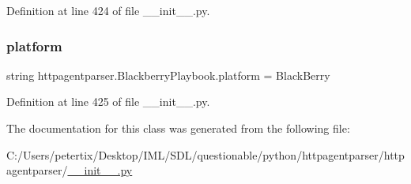 Definition at line 424 of file \+\_\+\+\_\+init\+\_\+\+\_\+.\+py.

\hypertarget{classhttpagentparser_1_1_blackberry_playbook_ab173bb0349f595500322016722f73b30}{}\label{classhttpagentparser_1_1_blackberry_playbook_ab173bb0349f595500322016722f73b30} 
\subsubsection{\texorpdfstring{platform}{platform}}
{\footnotesize\ttfamily string httpagentparser.\+Blackberry\+Playbook.\+platform = \textquotesingle{}Black\+Berry\textquotesingle{}\hspace{0.3cm}{\ttfamily [static]}}



Definition at line 425 of file \+\_\+\+\_\+init\+\_\+\+\_\+.\+py.



The documentation for this class was generated from the following file\+:\begin{DoxyCompactItemize}
\item 
C\+:/\+Users/petertix/\+Desktop/\+I\+M\+L/\+S\+D\+L/questionable/python/httpagentparser/httpagentparser/\hyperlink{____init_____8py}{\+\_\+\+\_\+init\+\_\+\+\_\+.\+py}\end{DoxyCompactItemize}
